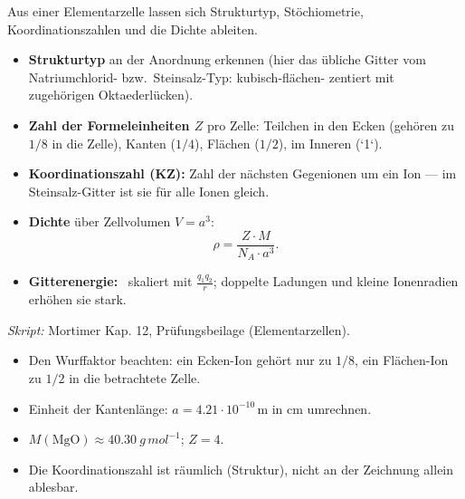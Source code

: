 

Aus einer Elementarzelle lassen sich Strukturtyp, Stöchiometrie,
Koordinationszahlen und die Dichte ableiten.

\begin{werkzeugkasten}
\begin{itemize}
  \item \textbf{Strukturtyp} an der Anordnung erkennen (hier das übliche
        Gitter vom Natriumchlorid- bzw.\ Steinsalz-Typ: kubisch-flächen-
        zentiert mit zugehörigen Oktaederlücken).
  \item \textbf{Zahl der Formeleinheiten $Z$} pro Zelle: Teilchen in den
        Ecken (gehören zu $1/8$ in die Zelle), Kanten ($1/4$), Flächen
        ($1/2$), im Inneren (`1`).
  \item \textbf{Koordinationszahl (KZ):} Zahl der nächsten Gegenionen um ein
        Ion --- im Steinsalz-Gitter ist sie für alle Ionen gleich.
  \item \textbf{Dichte} über Zellvolumen $V = a^3$:
        \[
          \rho = \frac{Z \cdot M}{N_A \cdot a^3}.
        \]
  \item \textbf{Gitterenergie:} ~skaliert mit $\frac{q_1 q_2}{r}$; doppelte
        Ladungen und kleine Ionenradien erhöhen sie stark.
\end{itemize}
\textit{Skript:} Mortimer Kap. 12, Prüfungsbeilage (Elementarzellen).
\end{werkzeugkasten}

\begin{achtung}
\begin{itemize}
  \item Den Wurffaktor beachten: ein Ecken-Ion gehört nur zu $1/8$, ein
        Flächen-Ion zu $1/2$ in die betrachtete Zelle.
  \item Einheit der Kantenlänge: $a=4.21\cdot10^{-10}\,$m in cm umrechnen.
  \item $M(\mathrm{MgO}) \approx 40.30\ g\,mol^{-1}$; $Z=4$.
  \item Die Koordinationszahl ist räumlich (Struktur), nicht an der
        Zeichnung allein ablesbar.
\end{itemize}
\end{achtung}
